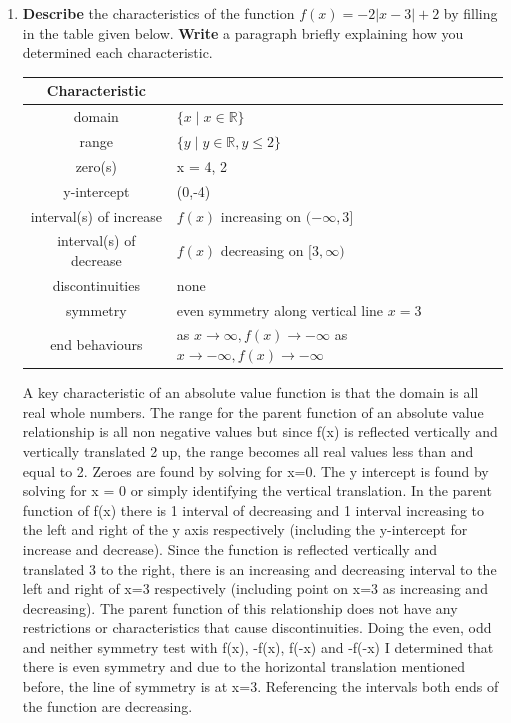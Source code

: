 \documentclass[12pt]{book}
\begin{document}

\begin{enumerate}

\item  \textbf{Describe} the characteristics of the function $f(x) = -2|x-3|+2$ by filling in the table given below. \textbf{Write} a paragraph briefly explaining how you determined each characteristic.\\

\vspace{0.3 cm}

\renewcommand{\arraystretch}{3}  %
\begin{center}

\begin{tabular}{|c|m{4in}|}
\hline
\textbf{Characteristic} &  \\
\hline
domain & $\{ x \mid x \in \mathbb{R} \}$\\
\hline
range & $\{ y \mid y \in \mathbb{R}, y \leq 2 \}$\\
\hline
zero(s) & x = 4, 2\\
\hline
y-intercept & (0,-4)\\
\hline
interval(s) of increase & $f(x)$ increasing on $(-\infty, 3]$\\
\hline
interval(s) of decrease & $f(x)$ decreasing on $[3, \infty)$\\
\hline
discontinuities & none\\
\hline
symmetry & even symmetry along vertical line $x=3$\\
\hline
end behaviours & \shortstack[l]{as $x \to \infty, f(x) \to -\infty$ \\ as $x \to -\infty, f(x) \to -\infty$}\\
\hline
\end{tabular}
\end{center}

A key characteristic of an absolute value function is that the domain is all
 real whole numbers. The range for the parent function of an absolute
value relationship is all non negative values but since f(x)
is reflected vertically and vertically translated 2 up, the range becomes all
real values less than and equal to 2. Zeroes are found by solving for x=0.
The y intercept is found by solving for x = 0 or simply identifying the vertical translation.
In the parent function of f(x) there is 1 interval of decreasing and 1 interval increasing to 
the left and right of the y axis respectively (including the y-intercept for increase and decrease).
 Since the function is reflected vertically and translated 3 to the right, there is an increasing and decreasing interval to the
left and right of x=3 respectively (including point on x=3 as increasing and decreasing). 
The parent function of this relationship does not have any restrictions or characteristics
that cause discontinuities. Doing the even, odd and neither symmetry test with f(x), -f(x), f(-x) and -f(-x)
I determined that there is even symmetry and due to the horizontal translation mentioned before, the line
of symmetry is at x=3. Referencing the intervals both ends of the function are decreasing.


\end{enumerate}
\end{document}
